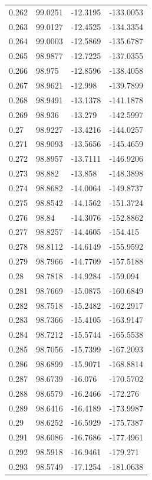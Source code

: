 \begin{tabular}{llll}
0.262 & 99.0251 & -12.3195 & -133.0053 \\
0.263 & 99.0127 & -12.4525 & -134.3354 \\
0.264 & 99.0003 & -12.5869 & -135.6787 \\
0.265 & 98.9877 & -12.7225 & -137.0355 \\
0.266 & 98.975 & -12.8596 & -138.4058 \\
0.267 & 98.9621 & -12.998 & -139.7899 \\
0.268 & 98.9491 & -13.1378 & -141.1878 \\
0.269 & 98.936 & -13.279 & -142.5997 \\
0.27 & 98.9227 & -13.4216 & -144.0257 \\
0.271 & 98.9093 & -13.5656 & -145.4659 \\
0.272 & 98.8957 & -13.7111 & -146.9206 \\
0.273 & 98.882 & -13.858 & -148.3898 \\
0.274 & 98.8682 & -14.0064 & -149.8737 \\
0.275 & 98.8542 & -14.1562 & -151.3724 \\
0.276 & 98.84 & -14.3076 & -152.8862 \\
0.277 & 98.8257 & -14.4605 & -154.415 \\
0.278 & 98.8112 & -14.6149 & -155.9592 \\
0.279 & 98.7966 & -14.7709 & -157.5188 \\
0.28 & 98.7818 & -14.9284 & -159.094 \\
0.281 & 98.7669 & -15.0875 & -160.6849 \\
0.282 & 98.7518 & -15.2482 & -162.2917 \\
0.283 & 98.7366 & -15.4105 & -163.9147 \\
0.284 & 98.7212 & -15.5744 & -165.5538 \\
0.285 & 98.7056 & -15.7399 & -167.2093 \\
0.286 & 98.6899 & -15.9071 & -168.8814 \\
0.287 & 98.6739 & -16.076 & -170.5702 \\
0.288 & 98.6579 & -16.2466 & -172.276 \\
0.289 & 98.6416 & -16.4189 & -173.9987 \\
0.29 & 98.6252 & -16.5929 & -175.7387 \\
0.291 & 98.6086 & -16.7686 & -177.4961 \\
0.292 & 98.5918 & -16.9461 & -179.271 \\
0.293 & 98.5749 & -17.1254 & -181.0638 \\

\end{tabular}
